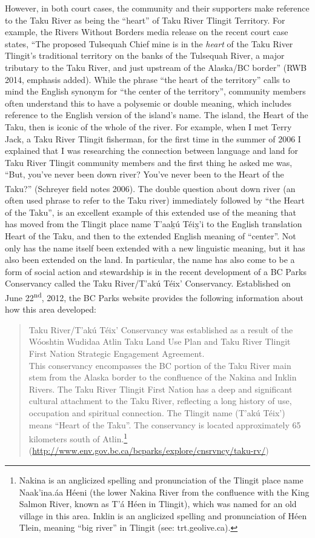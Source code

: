 However, in both court cases, the community and their supporters make reference to the Taku River as being the “heart” of Taku River Tlingit Territory. For example, the Rivers Without Borders media release on the recent court case states, “The proposed Tulsequah Chief mine is in the \textit{heart} of the Taku River Tlingit’s traditional territory on the banks of the Tulsequah River, a major tributary to the Taku River, and just upstream of the Alaska/BC border” (RWB 2014, emphasis added). While the phrase “the heart of the territory” calls to mind the English synonym for “the center of the territory”, community members often understand this to have a polysemic or double meaning, which includes reference to the English version of the island’s name. The island, the Heart of the Taku, then is iconic of the whole of the river. For example, when I met Terry Jack, a Taku River Tlingit fisherman, for the first time in the summer of 2006 I explained that I was researching the connection between language and land for Taku River Tlingit community members and the first thing he asked me was, “But, you’ve never been down river? You’ve never been to the Heart of the Taku?”\textsuperscript{ }(Schreyer field notes 2006). The double question about down river (an often used phrase to refer to the Taku river) immediately followed by “the Heart of the Taku”, is an excellent example of this extended use of the meaning that has moved from the Tlingit place name T'aak̲ú Téix̲'i to the English translation Heart of the Taku, and then to the extended English meaning of “center”. Not only has the name itself been extended with a new linguistic meaning, but it has also been extended on the land. In particular, the name has also come to be a form of social action and stewardship is in the recent development of a BC Parks Conservancy called the Taku River/T’akú Téix’ Conservancy. Established on June 22\textsuperscript{nd}, 2012, the BC Parks website provides the following information about how this area developed:

\begin{quote}
Taku River/T’akú Téix’ Conservancy was established as a result of the Wóoshtin Wudidaa Atlin Taku Land Use Plan and Taku River Tlingit First Nation Strategic Engagement Agreement. \\

This conservancy encompasses the BC portion of the Taku River main stem from the Alaska border to the confluence of the Nakina and Inklin Rivers. The Taku River Tlingit First Nation has a deep and significant cultural attachment to the Taku River, reflecting a long history of use, occupation and spiritual connection. The Tlingit name (T’akú Téix’) means “Heart of the Taku”. The conservancy is located approximately 65 kilometers south of Atlin.\footnote{ Nakina is an anglicized spelling and pronunciation of the Tlingit place name Naak’ina.áa Héeni (the lower Nakina River from the confluence with the King Salmon River, known as T’á Héen in Tlingit), which was named for an old village in this area. Inklin is an anglicized spelling and pronunciation of Héen Tlein, meaning “big river” in Tlingit (see: trt.geolive.ca). } (\url{http://www.env.gov.bc.ca/bcparks/explore/cnsrvncy/taku-rv/})
\end{quote}

